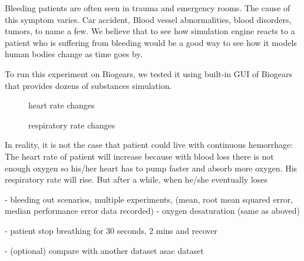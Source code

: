 \documentclass[a4paper]{article}
\begin{document}
Bleeding patients are often seen in trauma and emergency rooms. The cause of this symptom varies. Car accident, Blood vessel abnormalities, blood disorders, tumors, to name a few. We believe that to see how simulation engine reacts to a patient who is suffering from bleeding would be a good way to see how it models human bodies change as time goes by.

To run this experiment on Biogears, we tested it using built-in GUI of Biogears that provides dozens of substances simulation.  

\begin{figure}[!htb]\centering
   \begin{minipage}{0.49\textwidth}
     \caption{heart rate changes}
     \label{fig:patient bleeding}
     
   \end{minipage}
   \begin {minipage}{0.49\textwidth}
     \caption{respiratory rate changes}
     \label{fig:patient bleeding}
   \end{minipage}
\end{figure}

In reality, it is not the case that patient could live with continuous hemorrhage: The heart rate of patient will increase because with blood loss there is not enough oxygen so his/her heart has to pump faster and absorb more oxygen. His respiratory rate will rise. But after a while, when he/she eventually loses


- bleeding out scenarios, multiple experiments, (mean, root mean squared error, median performance error data recorded)
- oxygen desaturation (same as aboved)

- patient stop breathing for 30 seconds, 2 mins and recover

- (optional) compare with another dataset asac dataset
\end{document}
